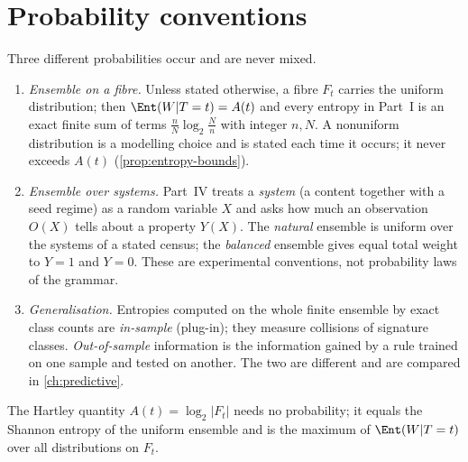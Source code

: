 \section{Probability conventions}\label{sec:probconv}
Three different probabilities occur and are never mixed.
\begin{enumerate}[label=(\roman*)]
\item \emph{Ensemble on a fibre.} Unless stated otherwise, a fibre $F_t$ carries the uniform distribution; then $\Ent(W|T=t)=A(t)$ and every entropy in Part~I is an exact finite sum of terms $\frac{n}{N}\log_2\frac Nn$ with integer $n,N$. A nonuniform distribution is a modelling choice and is stated each time it occurs; it never exceeds $A(t)$ (\cref{prop:entropy-bounds}).
\item \emph{Ensemble over systems.} Part~IV treats a \emph{system} (a content together with a seed regime) as a random variable $X$ and asks how much an observation $O(X)$ tells about a property $Y(X)$. The \emph{natural} ensemble is uniform over the systems of a stated census; the \emph{balanced} ensemble gives equal total weight to $Y=1$ and $Y=0$. These are experimental conventions, not probability laws of the grammar.
\item \emph{Generalisation.} Entropies computed on the whole finite ensemble by exact class counts are \emph{in-sample} (plug-in); they measure collisions of signature classes. \emph{Out-of-sample} information is the information gained by a rule trained on one sample and tested on another. The two are different and are compared in \cref{ch:predictive}.
\end{enumerate}
The Hartley quantity $A(t)=\log_2|F_t|$ needs no probability; it equals the Shannon entropy of the uniform ensemble and is the maximum of $\Ent(W|T=t)$ over all distributions on $F_t$.
